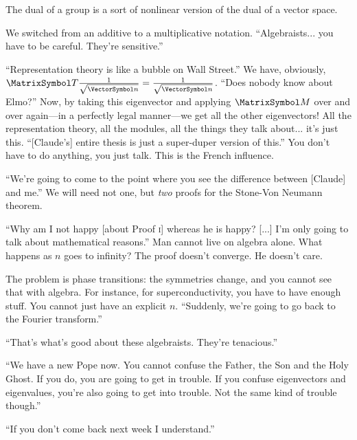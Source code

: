 \documentclass[10pt, a4paper, twoside]{lecturenotes}
\begin{document}
\begin{lecture}[date=2013-03-21, official=true]
\begingroup
\newcommand{\vsqrtninv}{\frac{1}{\sqrt{\vn}}}
The dual of a group is a sort of nonlinear version of the dual of a vector space.

We switched from an additive to a multiplicative notation. ``Algebraists... you have to be careful. They're sensitive.''

``Representation theory is like a bubble on Wall Street.'' We have, obviously, $\matT  \vsqrtninv = \vsqrtninv$. ``Does nobody know about Elmo?''  Now, by taking this eigenvector and applying $\matM$ over and over again---in a perfectly legal manner---we get all the other eigenvectors! All the representation theory, all the modules, all the things they talk about... it's just this. ``[Claude's] entire thesis is just a super-duper version of this.'' You don't have to do anything, you just talk. This is the French influence.

``We're going to come to the point where you see the difference between [Claude] and me.'' We will need not one, but \emph{two} proofs for the Stone-Von Neumann theorem.

``Why am I not happy [about Proof \textsc{i}] whereas he is happy? [...] I'm only going to talk about mathematical reasons.'' Man cannot live on algebra alone. What happens as $n$ goes to infinity? The proof doesn't converge. He doesn't care. 

The problem is phase transitions: the symmetries change, and you cannot see that with algebra. For instance, for superconductivity, you have to have enough stuff. You cannot just have an explicit $n$. 
``Suddenly, we're going to go back to the Fourier transform.'' 

\noindent
``That's what's good about these algebraists. They're tenacious.''

``We have a new Pope now. You cannot confuse the Father, the Son and the Holy Ghost. If you do, you are going to get in trouble. If you confuse eigenvectors and eigenvalues, you're also going to get into trouble. Not the same kind of trouble though.''

``If you don't come back next week I understand.''
\endgroup
\end{lecture}
\end{document}
